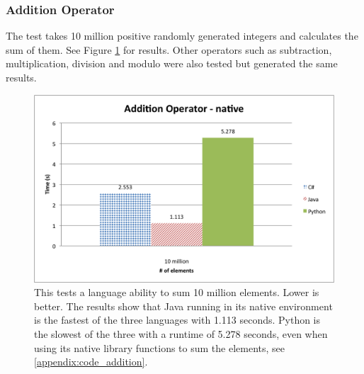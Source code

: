 \subsubsection{Addition Operator}

The test takes 10 million positive randomly generated integers and calculates the sum of them. See Figure \ref{fig:native_addition} for results. Other operators such as subtraction, multiplication, division and modulo were also tested but generated the same results.

\begin{figure}[h]
	\centering
	\includegraphics[width=1.0\linewidth]{chapters/new_media/AdditionOperatorNative.png}
	\caption{This tests a language ability to sum 10 million elements. Lower is better. The results show that Java running in its native environment is the fastest of the three languages with 1.113 seconds. Python is the slowest of the three with a runtime of 5.278 seconds, even when using its native library functions to sum the elements, see \ref{appendix:code_addition}.}
	\label{fig:native_addition}
\end{figure}
